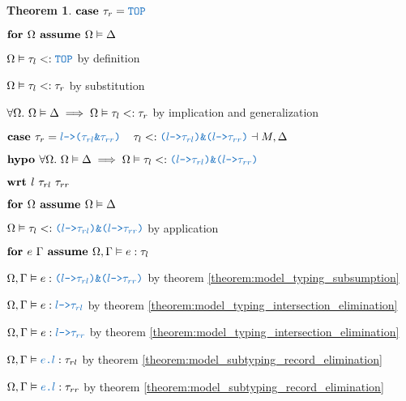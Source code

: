 \documentclass[acmsmall]{acmart}
\theoremstyle{definition}
\newtheorem{theorem}{Theorem}[section]
\begin{document}
\begin{theorem}
    \item \Z $\B{case } \tau_r = \obj{TOP}$
      \item \Z\Z $\textbf{for } \Omega \textbf{ assume } \Omega \vDash \Delta$
        \item \Z\Z\Z $\Omega \satisfies \tau_l \subtypes \obj{TOP}$ by definition
        \item \Z\Z\Z $\Omega \vDash \tau_l <: \tau_r$ by substitution 
      \item \Z\Z $\forall \Omega .\ \Omega \vDash \Delta \implies \Omega \vDash \tau_l <: \tau_r$ 
      by implication and generalization 

    \item \Z $\B{case } 
      \tau_r = \obj{$l$->($\tau_{rl}$\&$\tau_{rr}$)}
      \I
      \tau_l
      \subtypes
      \obj{($l$->$\tau_{rl}$)\&($l$->$\tau_{rr}$)}
      \given M, \Delta
    $
    \item \Z $\B{hypo }
      \forall \Omega .\ 
      \Omega \satisfies \Delta
      \implies
      \Omega \satisfies \tau_l \subtypes \obj{($l$->$\tau_{rl}$)\&($l$->$\tau_{rr}$)}
    $ 
    \item \Z $\B{wrt } l\ \tau_{rl}\ \tau_{rr}$ 
      \item \Z\Z $\textbf{for } \Omega \textbf{ assume } \Omega \vDash \Delta$
        \item \Z\Z\Z $\Omega \satisfies \tau_l \subtypes \obj{($l$->$\tau_{rl}$)\&($l$->$\tau_{rr}$)}$
        by application
        \item \Z\Z\Z $\textbf{for } e\ \Gamma \textbf{ assume } \Omega, \Gamma \vDash e : \tau_l$ 
          \item \Z\Z\Z\Z $\Omega, \Gamma \satisfies e \hastype \obj{($l$->$\tau_{rl}$)\&($l$->$\tau_{rr}$)}$
          by theorem \ref{theorem:model_typing_subsumption} 
          \item \Z\Z\Z\Z $\Omega, \Gamma \satisfies e \hastype \obj{$l$->$\tau_{rl}$}$ by theorem \ref{theorem:model_typing_intersection_elimination}
          \item \Z\Z\Z\Z $\Omega, \Gamma \satisfies e \hastype \obj{$l$->$\tau_{rr}$}$ by theorem \ref{theorem:model_typing_intersection_elimination}
          \item \Z\Z\Z\Z $\Omega, \Gamma \satisfies \obj{$e$.$l$} \hastype \tau_{rl}$ by theorem \ref{theorem:model_subtyping_record_elimination}
          \item \Z\Z\Z\Z $\Omega, \Gamma \satisfies \obj{$e$.$l$} \hastype \tau_{rr}$ by theorem \ref{theorem:model_subtyping_record_elimination}

\end{theorem}
\end{document}
